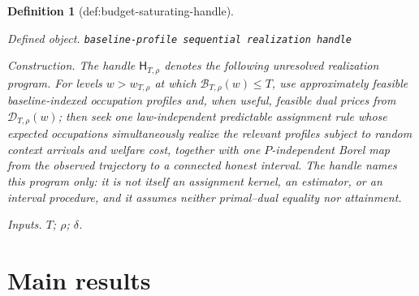 \documentclass{article}
\newtheorem{definition}{Definition}
\begin{document}
\begin{definition}[def:budget-saturating-handle]\label{def:budget-saturating-handle}
\par\smallskip\noindent\emph{Defined object.} \texttt{baseline-\allowbreak{}profile sequential realization handle}
\par\smallskip\noindent\emph{Construction.} The handle \(\mathsf H_{T,\rho}\) denotes the following unresolved realization program.  For levels \(w>w_{T,\rho}\) at which \(\mathcal B_{T,\rho}(w)\le T\), use approximately feasible baseline-indexed occupation profiles and, when useful, feasible dual prices from \(\mathcal D_{T,\rho}(w)\); then seek one law-independent predictable assignment rule whose expected occupations simultaneously realize the relevant profiles subject to random context arrivals and welfare cost, together with one \(P\)-independent Borel map from the observed trajectory to a connected honest interval.  The handle names this program only: it is not itself an assignment kernel, an estimator, or an interval procedure, and it assumes neither primal--dual equality nor attainment.
\par\smallskip\noindent\emph{Inputs.} \(T\); \(\rho\); \(\delta\).
\end{definition}

\section{Main results}
\end{document}
